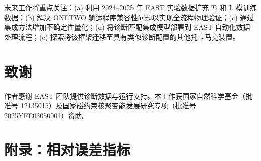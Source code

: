 \documentclass[a4paper,12pt]{ctexart}
\begin{document}
未来工作将重点关注：(a) 利用 2024--2025 年 EAST 实验数据扩充 $T_i$ 和 L 模训练数据；(b) 解决 ONETWO 输运程序兼容性问题以实现全流程物理验证；(c) 通过集成方法增加不确定性量化；(d) 将诊断匹配集成模型部署到 EAST 自动化数据处理流程；(e) 探索将该框架迁移至具有类似诊断配置的其他托卡马克装置。

\section*{致谢}

作者感谢 EAST 团队提供诊断数据与运行支持。本工作获国家自然科学基金（批准号 12135015）及国家磁约束核聚变能发展研究专项（批准号 2025YFE03050001）资助。

\section*{附录：相对误差指标}

\begin{table}[htbp]
\centering\footnotesize
\caption{NN 方法相对 mtanh 基线的平均相对误差（MeanRel\% $\pm$ 标准差），按诊断与等离子体模式统计（H 模：14 个时间点；L 模：10 个时间点）。MeanRel\% 由低值边缘区域（$\rho \to 1$）主导——该处微小绝对偏差即产生大相对误差。L 模 Te 行被新增的 156900 低 $T_e$ 点（芯部 $T_e$ 0.2--1.1 keV）抬高——其边缘值趋近于零、相对误差病态；原四炮的 L 模 Te 误差为 22--30\%，低于扩充后的 H 模范围 37--51\%。每行最优值用\textbf{粗体}标出。}
\label{tab:meanrel}
\end{table}
\end{document}
